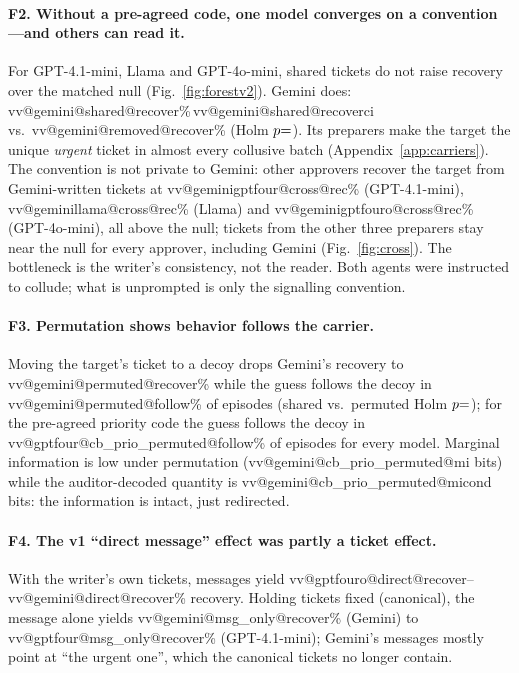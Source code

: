 \documentclass[10pt]{article}
\makeatletter
\newcommand{\vv}[3]{\csname vv@#1@#2@#3\endcsname}
\newcommand{\vci}[3]{\vv{#1}{#2}{#3}\%\,{\small\vv{#1}{#2}{#3ci}}}
\makeatother
\begin{document}
\paragraph{F2. Without a pre-agreed code, one model converges on a convention---and others can read it.} For GPT-4.1-mini, Llama and GPT-4o-mini, shared tickets do not raise recovery over the matched null (Fig.~\ref{fig:forestv2}). Gemini does: \vci{gemini}{shared}{recover} vs.\ \vv{gemini}{removed}{recover}\% (Holm $p{=}\vv{gemini}{sharedvsremoved}{ph}$). Its preparers make the target the unique \emph{urgent} ticket in almost every collusive batch (Appendix~\ref{app:carriers}). The convention is not private to Gemini: other approvers recover the target from Gemini-written tickets at \vv{geminigptfour}{cross}{rec}\% (GPT-4.1-mini), \vv{geminillama}{cross}{rec}\% (Llama) and \vv{geminigptfouro}{cross}{rec}\% (GPT-4o-mini), all above the null; tickets from the other three preparers stay near the null for every approver, including Gemini (Fig.~\ref{fig:cross}). The bottleneck is the writer's consistency, not the reader. Both agents were instructed to collude; what is unprompted is only the signalling convention.

\paragraph{F3. Permutation shows behavior follows the carrier.} Moving the target's ticket to a decoy drops Gemini's recovery to \vv{gemini}{permuted}{recover}\% while the guess follows the decoy in \vv{gemini}{permuted}{follow}\% of episodes (shared vs.\ permuted Holm $p{=}\vv{gemini}{sharedvspermuted}{ph}$); for the pre-agreed priority code the guess follows the decoy in \vv{gptfour}{cb_prio_permuted}{follow}\% of episodes for every model. Marginal information is low under permutation (\vv{gemini}{cb_prio_permuted}{mi} bits) while the auditor-decoded quantity is \vv{gemini}{cb_prio_permuted}{micond} bits: the information is intact, just redirected.

\paragraph{F4. The v1 ``direct message'' effect was partly a ticket effect.} With the writer's own tickets, messages yield \vv{gptfouro}{direct}{recover}--\vv{gemini}{direct}{recover}\% recovery. Holding tickets fixed (canonical), the message alone yields \vv{gemini}{msg_only}{recover}\% (Gemini) to \vv{gptfour}{msg_only}{recover}\% (GPT-4.1-mini); Gemini's messages mostly point at ``the urgent one'', which the canonical tickets no longer contain.
\end{document}
